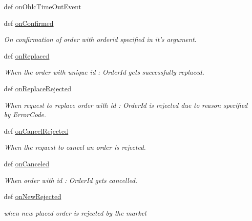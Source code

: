 \begin{DoxyCompactItemize}
def \hyperlink{classmuTradePyBase_1_1CustomStrategy_aa94a2228807baeaab027108dc663675e}{onOhlcTimeOutEvent}
\item 
def \hyperlink{classmuTradePyBase_1_1CustomStrategy_a2d99ec0bbe867655ed7f9373812d7a56}{onConfirmed}
\begin{DoxyCompactList}\small\item\em On confirmation of order with orderid specified in it's argument. \item\end{DoxyCompactList}\item 
def \hyperlink{classmuTradePyBase_1_1CustomStrategy_a85a80a9afefdf345a46c520fad9b5138}{onReplaced}
\begin{DoxyCompactList}\small\item\em When the order with unique id : OrderId gets successfully replaced. \item\end{DoxyCompactList}\item 
def \hyperlink{classmuTradePyBase_1_1CustomStrategy_a2e18cb62689e42982bc46836f5fa156b}{onReplaceRejected}
\begin{DoxyCompactList}\small\item\em When request to replace order with id : OrderId is rejected due to reason specified by ErrorCode. \item\end{DoxyCompactList}\item 
def \hyperlink{classmuTradePyBase_1_1CustomStrategy_ac0dc077ece6c64c2a61ee3b9f511c680}{onCancelRejected}
\begin{DoxyCompactList}\small\item\em When the request to cancel an order is rejected. \item\end{DoxyCompactList}\item 
def \hyperlink{classmuTradePyBase_1_1CustomStrategy_ad17943f78d2a1a38716e94067eba0804}{onCanceled}
\begin{DoxyCompactList}\small\item\em When order with id : OrderId gets cancelled. \item\end{DoxyCompactList}\item 
def \hyperlink{classmuTradePyBase_1_1CustomStrategy_a5274ec9bdcddf755f17f2fc0817e4e19}{onNewRejected}
\begin{DoxyCompactList}\small\item\em when new placed order is rejected by the market \item\end{DoxyCompactList}\item 

\end{DoxyCompactItemize}
